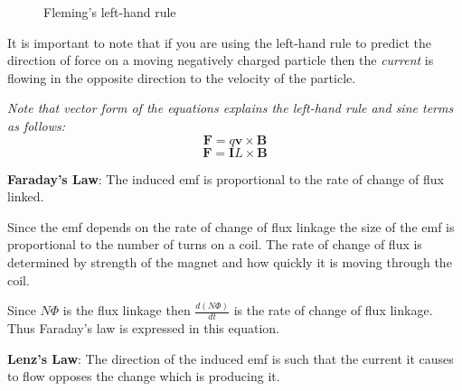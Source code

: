 \documentclass[revision-guide.tex]{subfiles}
\begin{document}
\begin{figure}[ht]
  \begin{center}
  \end{center}
  \caption{Fleming's left-hand rule}
  \label{flemminglh}
\end{figure}

It is important to note that if you are using the left-hand rule to predict the direction of force on a moving negatively charged particle then the \emph{current} is flowing in the opposite direction to the velocity of the particle.

\emph{Note that vector form of the equations explains the left-hand rule and sine terms as follows:}
$$\mathbf{F} = q\mathbf{v}\times\mathbf{B}$$
$$\mathbf{F} = \mathbf{I}L\times\mathbf{B}$$
\newpage
{}

\begin{framed}
\textbf{Faraday's Law}: The induced emf is proportional to the rate of change of flux linked.
\end{framed}

Since the emf depends on the rate of change of flux linkage the size of the emf is proportional to the number of turns on a coil. The rate of change of flux is determined by strength of the magnet and how quickly it is moving through the coil.


Since $N\Phi$ is the flux linkage then $\frac{d(N\Phi)}{dt}$ is the rate of change of flux linkage. Thus Faraday's law is expressed in this equation.

\begin{framed}
\textbf{Lenz's Law}: The direction of the induced emf is such that the current it causes to flow opposes the change which is producing it.
\end{framed}
\end{document}

